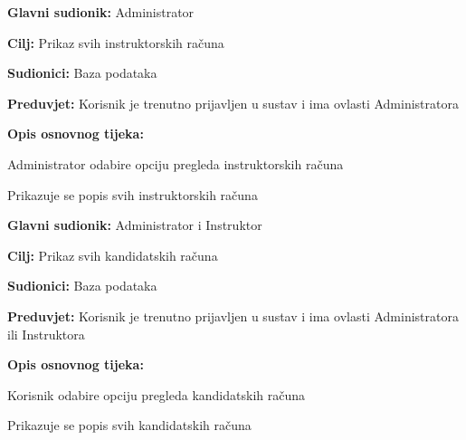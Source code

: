 \noindent {}
	\begin{packed_item}
		
		\item \textbf{Glavni sudionik:} Administrator
		\item  \textbf{Cilj:} Prikaz svih instruktorskih računa 
		\item  \textbf{Sudionici:} Baza podataka
		\item  \textbf{Preduvjet:} Korisnik je trenutno prijavljen u sustav i ima ovlasti Administratora
		\item  \textbf{Opis osnovnog tijeka:}
		
		\item[] \begin{packed_enum}
			
			\item Administrator odabire opciju pregleda instruktorskih računa
			\item Prikazuje se popis svih instruktorskih računa
			
		\end{packed_enum}
		
	\end{packed_item}

 \noindent {}
	\begin{packed_item}
		
		\item \textbf{Glavni sudionik:} Administrator i Instruktor
		\item  \textbf{Cilj:} Prikaz svih kandidatskih računa 
		\item  \textbf{Sudionici:} Baza podataka
		\item  \textbf{Preduvjet:} Korisnik je trenutno prijavljen u sustav i ima ovlasti Administratora ili Instruktora
		\item  \textbf{Opis osnovnog tijeka:}
		
		\item[] \begin{packed_enum}
			
			\item Korisnik odabire opciju pregleda kandidatskih računa
			\item Prikazuje se popis svih kandidatskih računa
			
		\end{packed_enum}
		
	\end{packed_item}

